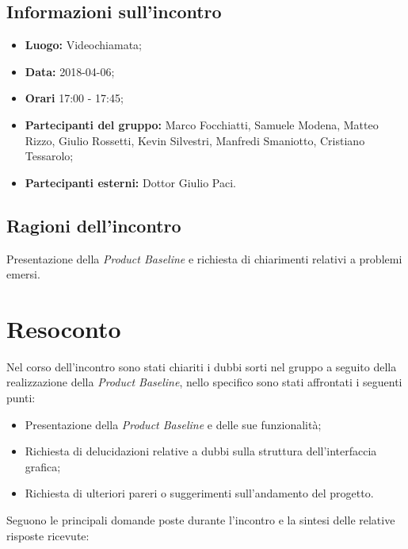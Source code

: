 \documentclass[openany,12pt,a4paper]{article}
\begin{document}
  \subsection{Informazioni sull'incontro} 
   
  \begin{itemize}  
      \item \textbf{Luogo:} Videochiamata;
      \item \textbf{Data:} 2018-04-06; 
      \item \textbf{Orari} 17:00 - 17:45;
      \item \textbf{Partecipanti del gruppo:} Marco Focchiatti, Samuele Modena, Matteo Rizzo, Giulio Rossetti, Kevin Silvestri, Manfredi Smaniotto, Cristiano Tessarolo; 
      \item \textbf{Partecipanti esterni:} Dottor Giulio Paci. 
  \end{itemize} 
 
  \subsection{Ragioni dell'incontro} 
  Presentazione della \textit{Product Baseline} e richiesta di chiarimenti relativi a problemi emersi. 
 
  \section{Resoconto} 
  Nel corso dell'incontro sono stati chiariti i dubbi sorti nel gruppo a seguito della realizzazione della \textit{Product Baseline}, nello specifico sono stati affrontati i seguenti punti:
	
  \begin{itemize}
	\item Presentazione della \textit{Product Baseline} e delle sue funzionalità;
	\item Richiesta di delucidazioni relative a dubbi sulla struttura dell'interfaccia grafica;
	\item Richiesta di ulteriori pareri o suggerimenti sull'andamento del progetto.
  \end{itemize}
	
  \noindent Seguono le principali domande poste durante l'incontro e la sintesi delle relative risposte ricevute:
\end{document}
